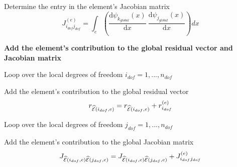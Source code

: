 \begin{DoxyItemize}
\begin{DoxyItemize}
\begin{DoxyItemize}
\begin{DoxyItemize}
\item Determine the entry in the element's Jacobian matrix \[ J_{i_{dof}j_{dof}}^{(e)} = \int_{e} \left( \frac{\mbox{d} \psi_{k_{global}}(x)}{\mbox{d} x} \ \frac{\mbox{d} \psi_{j_{global}}(x)}{\mbox{d} x} \right) dx \]
\end{DoxyItemize}
\end{DoxyItemize}\par
 \par
 \begin{center} {\bfseries  Add the element's contribution to the global residual vector and Jacobian matrix } \end{center}  \par

\item Loop over the local degrees of freedom $ i_{dof}=1,...,n_{dof} $
\begin{DoxyItemize}
\item Add the element's contribution to the global residual vector \[ r_{\widehat{\cal E}(i_{dof},e)} = r_{\widehat{\cal E}(i_{dof},e)} + r_{i_{dof}}^{(e)} \]
\item Loop over the local degrees of freedom $ j_{dof}=1,...,n_{dof}$
\begin{DoxyItemize}
\item Add the element's contribution to the global Jacobian matrix \[ J_{\widehat{\cal E}(i_{dof},e)\widehat{\cal E}(j_{dof},e) } = J_{\widehat{\cal E}(i_{dof},e)\widehat{\cal E}(j_{dof},e) } + J_{i_{dof} j_{dof}}^{(e)} \]
\end{DoxyItemize}
\end{DoxyItemize}
\end{DoxyItemize}
\end{DoxyItemize}

